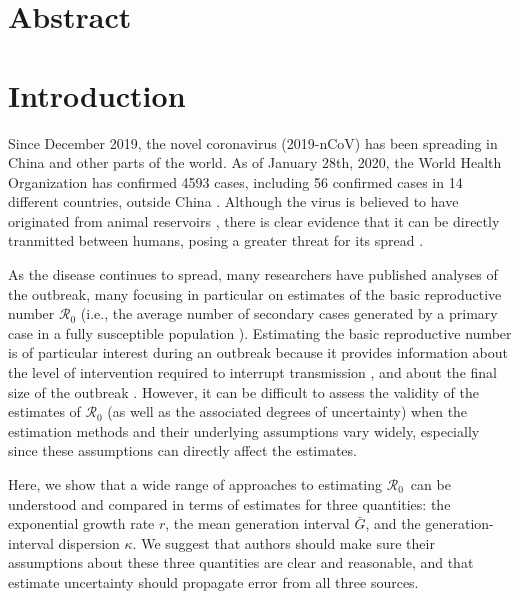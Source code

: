 \documentclass[12pt]{article}
\date{\today}
\newcommand{\Rx}[1]{\ensuremath{{\mathcal R}_{#1}}}
\newcommand{\Ro}{\Rx{0}}
\begin{document}
\begin{flushleft}{
	\Large
	\textbf{}
}

\bigskip

\end{flushleft}

\section*{Abstract}

\pagebreak

\section{Introduction}

Since December 2019, the novel coronavirus (2019-nCoV) has been spreading in China and other parts of the world.
As of January 28th, 2020, the World Health Organization has confirmed 4593 cases, including 56 confirmed cases in 14 different countries, outside China \citep{who28report}.
Although the virus is believed to have originated from animal reservoirs \citep{cdcncov}, 
there is clear evidence that it can be directly tranmitted between humans,
posing a greater threat for its spread \citep{huang2020clinical,who26report}.

As the disease continues to spread, many researchers have published analyses of the outbreak, many focusing in particular on estimates of the basic reproductive number $\mathcal R_0$ (i.e., the average number of secondary cases generated by a primary case in a fully susceptible population \citep{anderson1991infectious, diekmann1990definition}).
Estimating the basic reproductive number is of particular interest during an outbreak because it provides information about the level of intervention required to interrupt transmission \citep{anderson1991infectious}, and about the final size of the outbreak \citep{anderson1991infectious, ma2006generality}.
However, it can be difficult to assess the validity of the estimates of $\mathcal R_0$ (as well as the associated degrees of uncertainty) when the estimation methods and their underlying assumptions vary widely, especially since these assumptions can directly affect the estimates.

Here, we show that a wide range of approaches to estimating \Ro\ can be understood and compared in terms of estimates for three quantities: the exponential growth rate $r$, the mean generation interval $\bar G$, and the generation-interval dispersion $\kappa$. We suggest that authors should make sure their assumptions about these three quantities are clear and reasonable, and that estimate uncertainty should propagate error from all three sources. 
\end{document}
